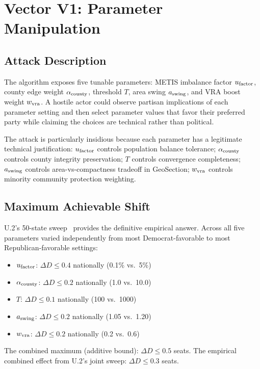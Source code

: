 \section{Vector V1: Parameter Manipulation}
\label{sec:v1}

\subsection{Attack Description}

The \bisect{} algorithm exposes five tunable parameters: METIS imbalance
factor $u_{\rm factor}$, county edge weight $\alpha_{\rm county}$,
\cs{} threshold $T$, area swing $a_{\rm swing}$, and VRA boost weight
$w_{\rm vra}$.
A hostile actor could observe partisan implications of each parameter setting
and then select parameter values that favor their preferred party while
claiming the choices are technical rather than political.

The attack is particularly insidious because each parameter has a legitimate
technical justification:
$u_{\rm factor}$ controls population balance tolerance;
$\alpha_{\rm county}$ controls county integrity preservation;
$T$ controls convergence completeness;
$a_{\rm swing}$ controls area-vs-compactness tradeoff in GeoSection;
$w_{\rm vra}$ controls minority community protection weighting.

\subsection{Maximum Achievable Shift}

U.2's 50-state sweep~\citep{b17paper} provides the definitive empirical
answer.
Across all five parameters varied independently from most Democrat-favorable
to most Republican-favorable settings:
\begin{itemize}
\item $u_{\rm factor}$: $\Delta D \leq 0.4$ nationally (0.1\% vs.\ 5\%)
\item $\alpha_{\rm county}$: $\Delta D \leq 0.2$ nationally (1.0 vs.\ 10.0)
\item $T$: $\Delta D \leq 0.1$ nationally (100 vs.\ 1000)
\item $a_{\rm swing}$: $\Delta D \leq 0.2$ nationally (1.05 vs.\ 1.20)
\item $w_{\rm vra}$: $\Delta D \leq 0.2$ nationally (0.2 vs.\ 0.6)
\end{itemize}
The combined maximum (additive bound): $\Delta D \leq 0.5$ seats.
The empirical combined effect from U.2's joint sweep: $\Delta D \leq 0.3$ seats.

